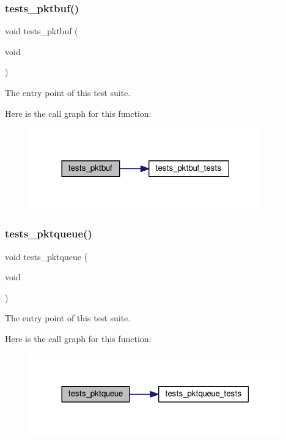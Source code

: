 \subsubsection{\texorpdfstring{tests\+\_\+pktbuf()}{tests\_pktbuf()}}
{\footnotesize\ttfamily void tests\+\_\+pktbuf (\begin{DoxyParamCaption}\item[{void}]{ }\end{DoxyParamCaption})}



The entry point of this test suite. 

Here is the call graph for this function\+:
\nopagebreak
\begin{figure}[H]
\begin{center}
\leavevmode
\includegraphics[width=285pt]{group__unittests_gaa089380b8bfe478c2b7f3684af323767_cgraph}
\end{center}
\end{figure}
\mbox{\label{group__unittests_ga01dc5c2a2dd69c690d952cd6e233cf60}} 
\subsubsection{\texorpdfstring{tests\+\_\+pktqueue()}{tests\_pktqueue()}}
{\footnotesize\ttfamily void tests\+\_\+pktqueue (\begin{DoxyParamCaption}\item[{void}]{ }\end{DoxyParamCaption})}



The entry point of this test suite. 

Here is the call graph for this function\+:
\nopagebreak
\begin{figure}[H]
\begin{center}
\leavevmode
\includegraphics[width=309pt]{group__unittests_ga01dc5c2a2dd69c690d952cd6e233cf60_cgraph}
\end{center}
\end{figure}
\mbox{\label{group__unittests_ga931f7ea19ee04d7b42dd1adb0f8ad87a}} 
